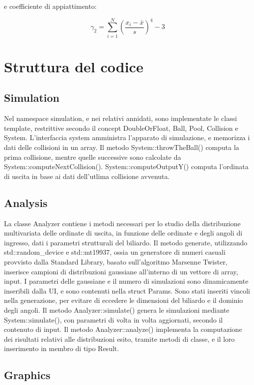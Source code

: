 \documentclass{article}
\begin{document}
e coefficiente di appiattimento:

\begin{equation}
   \gamma_2 =  \sum_{i=1}^N \left(\frac{x_i - \bar{x}}{s}\right)^4 - 3
\end{equation}

\section{Struttura del codice}
\subsection{Simulation}
Nel namespace simulation, e nei relativi annidati, sono implementate le classi template, restrittive secondo il concept DoubleOrFloat, Ball, Pool, Collision e System.
L'interfaccia system amministra l'apparato di simulazione, e memorizza i dati delle collisioni in un array. Il metodo System::throwTheBall() computa la prima collisione, mentre quelle successive sono calcolate da System::computeNextCollision(). System::computeOutputY() computa l'ordinata di uscita in base ai dati dell'utlima collisione avvenuta.

\subsection{Analysis}

La classe Analyzer contiene i metodi necessari per lo studio della distribuzione multivariata delle ordinate di uscita, in funzione delle ordinate e degli angoli di ingresso, dati i parametri strutturali del biliardo.
Il metodo generate, utilizzando std::random\_device e std::mt19937, ossia un generatore di numeri casuali provvisto dalla Standard Library, basato sull'algoritmo Marsenne Twister, inserisce campioni di distribuzioni gaussiane all'interno di un vettore di array, input.
I parametri delle gaussiane e il numero di simulazioni sono dinamicamente inseribili dalla UI, e sono contenuti nella struct Params.
Sono stati inseriti vincoli nella generazione, per evitare di eccedere le dimensioni del biliardo e il dominio degli angoli.
Il metodo Analyzer::simulate() genera le simulazioni mediante System::simulate(), con parametri di volta in volta aggiornati, secondo il contenuto di input.
Il metodo Analyzer::analyze() implementa la computazione dei risultati relativi alle distribuzioni esito, tramite metodi di classe, e il loro inserimento in membro di tipo Result.

\subsection{Graphics}
\end{document}
